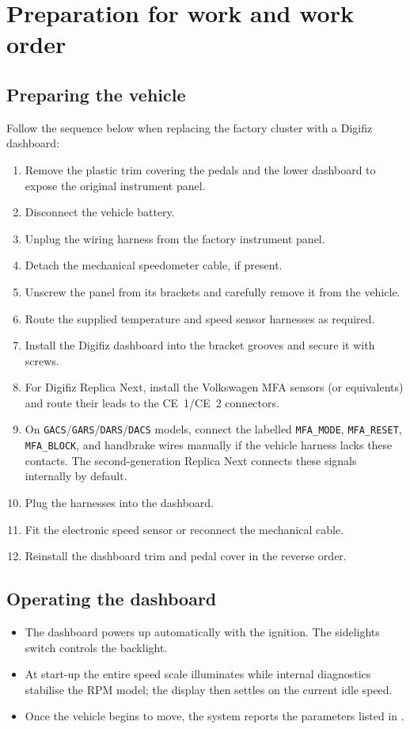 \chapter{Preparation for work and work order}\label{ch:preparation}

\section{Preparing the vehicle}
Follow the sequence below when replacing the factory cluster with a Digifiz dashboard:
\begin{enumerate}
    \item Remove the plastic trim covering the pedals and the lower dashboard to expose the original instrument panel.
    \item Disconnect the vehicle battery.
    \item Unplug the wiring harness from the factory instrument panel.
    \item Detach the mechanical speedometer cable, if present.
    \item Unscrew the panel from its brackets and carefully remove it from the vehicle.
    \item Route the supplied temperature and speed sensor harnesses as required.
    \item Install the Digifiz dashboard into the bracket grooves and secure it with screws.
    \item For Digifiz Replica Next, install the Volkswagen MFA sensors (or equivalents) and route their leads to the CE~1/CE~2 connectors.
    \item On \texttt{GACS}/\texttt{GARS}/\texttt{DARS}/\texttt{DACS} models, connect the labelled \texttt{MFA\_MODE}, \texttt{MFA\_RESET}, \texttt{MFA\_BLOCK}, and handbrake wires manually if the vehicle harness lacks these contacts. The second-generation Replica Next connects these signals internally by default.
    \item Plug the harnesses into the dashboard.
    \item Fit the electronic speed sensor or reconnect the mechanical cable.
    \item Reinstall the dashboard trim and pedal cover in the reverse order.
\end{enumerate}

\section{Operating the dashboard}
\begin{itemize}
    \item The dashboard powers up automatically with the ignition. The sidelights switch controls the backlight.
    \item At start-up the entire speed scale illuminates while internal diagnostics stabilise the RPM model; the display then settles on the current idle speed.
    \item Once the vehicle begins to move, the system reports the parameters listed in .
\end{itemize}

